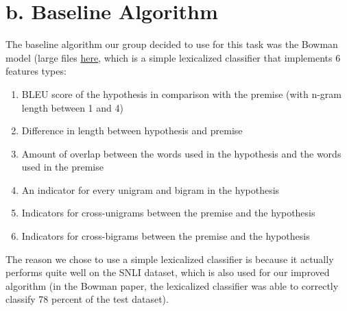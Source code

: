 \documentclass[12pt,letterpaper]{article}
\begin{document}
\section*{b. Baseline Algorithm}
The baseline algorithm our group decided to use for this task was the Bowman model (large files \href{https://drive.google.com/drive/folders/1qv8_adxl2img0Duwfg1bzuYQwucFKOR9}{here}, which is a simple lexicalized classifier that implements 6 features types: 
\begin{enumerate}
    \item BLEU score of the hypothesis in comparison with the premise (with n-gram length between 1 and 4)
    \item Difference in length between hypothesis and premise
    \item Amount of overlap between the words used in the hypothesis and the words used in the premise
    \item An indicator for every unigram and bigram in the hypothesis
    \item Indicators for cross-unigrams between the premise and the hypothesis
    \item Indicators for cross-bigrams between the premise and the hypothesis
\end{enumerate}
The reason we chose to use a simple lexicalized classifier is because it actually performs quite well on the SNLI dataset, which is also used for our improved algorithm (in the Bowman paper, the lexicalized classifier was able to correctly classify 78 percent of the test dataset). 
\end{document}
